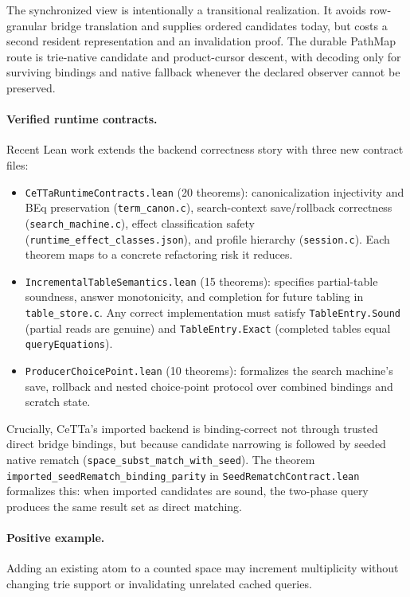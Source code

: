 \documentclass[11pt]{article}
\newcommand{\code}[1]{\texttt{#1}}
\newcommand{\CeTTa}{\textup{CeTTa}}
\newcommand{\PathMap}{\textup{PathMap}}
\begin{document}
The synchronized view is intentionally a transitional realization.  It
avoids row-granular bridge translation and supplies ordered candidates today,
but costs a second resident representation and an invalidation proof.  The
durable \PathMap{} route is trie-native candidate and product-cursor descent,
with decoding only for surviving bindings and native fallback whenever the
declared observer cannot be preserved.

\paragraph{Verified runtime contracts.}
Recent Lean work extends the backend correctness story with three new contract files:
\begin{itemize}
\item \code{CeTTaRuntimeContracts.lean} (20 theorems): canonicalization injectivity and BEq preservation (\code{term\_canon.c}), search-context save/rollback correctness (\code{search\_machine.c}), effect classification safety (\code{runtime\_effect\_classes.json}), and profile hierarchy (\code{session.c}).  Each theorem maps to a concrete refactoring risk it reduces.
\item \code{IncrementalTableSemantics.lean} (15 theorems): specifies partial-table soundness, answer monotonicity, and completion for future tabling in \code{table\_store.c}.  Any correct implementation must satisfy \code{TableEntry.Sound} (partial reads are genuine) and \code{TableEntry.Exact} (completed tables equal \code{queryEquations}).
\item \code{ProducerChoicePoint.lean} (10 theorems): formalizes the search machine's save, rollback and nested choice-point protocol over combined bindings and scratch state.
\end{itemize}

Crucially, \CeTTa{}'s imported backend is binding-correct not through trusted direct bridge bindings, but because candidate narrowing is followed by seeded native rematch (\code{space\_subst\_match\_with\_seed}).  The theorem \code{imported\_seedRematch\_binding\_parity} in \code{SeedRematchContract.lean} formalizes this: when imported candidates are sound, the two-phase query produces the same result set as direct matching.

\paragraph{Positive example.}
Adding an existing atom to a counted space may increment multiplicity without
changing trie support or invalidating unrelated cached queries.
\end{document}
